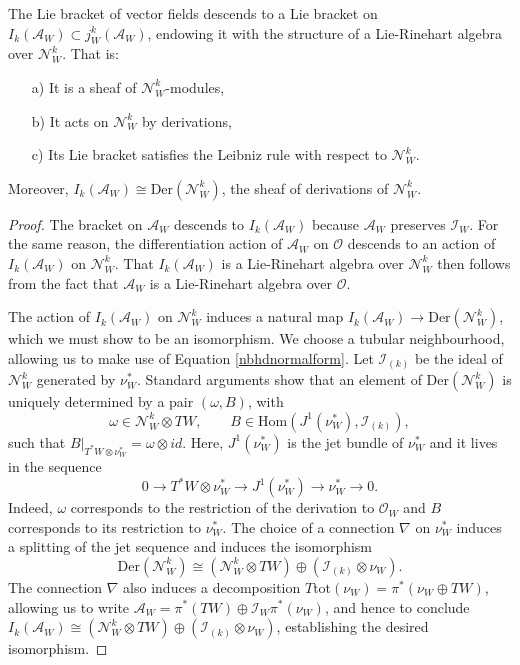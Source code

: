 \documentclass[10pt]{amsart}
\numberwithin{theoremalpha}{section}
\numberwithin{equation}{section}
\numberwithin{definition}{section}
\numberwithin{theorem}{section}
\numberwithin{proposition}{section}
\numberwithin{lemma}{section}
\numberwithin{example}{section}
\numberwithin{remark}{section}
\numberwithin{corollary}{section}
\numberwithin{question}{section}
\numberwithin{problem}{section}
\numberwithin{assumption}{section}
\theoremstyle{named}
\numberwithin{equation}{section}
\begin{document}
\begin{proposition} \label{derivationtheorem}
The Lie bracket of vector fields descends to a Lie bracket on $I_{k}(\mathcal{A}_{W}) \subset j^k_W(\mathcal{A}_W)$, endowing it with the structure of a Lie-Rinehart algebra over $\mathcal{N}_{W}^{k}$. That is: 
\begin{itemize}
\item[a)] It is a sheaf of $\mathcal{N}_{W}^{k}$-modules, 
\item[b)] It acts on $\mathcal{N}_{W}^{k}$ by derivations, 
\item[c)] Its Lie bracket satisfies the Leibniz rule with respect to $\mathcal{N}_{W}^{k}$. 
\end{itemize} 
Moreover, $I_{k}(\mathcal{A}_{W}) \cong \mathrm{Der}(\mathcal{N}_{W}^{k})$, the sheaf of derivations of $\mathcal{N}_{W}^{k}$. 
\end{proposition}
\begin{proof}
The bracket on $\mathcal{A}_{W}$ descends to $I_{k}(\mathcal{A}_{W})$ because $\mathcal{A}_{W}$ preserves $\mathcal{I}_W$. For the same reason, the differentiation action of $\mathcal{A}_{W}$ on $\mathcal{O}$ descends to an action of $I_{k}(\mathcal{A}_{W})$ on $\mathcal{N}_{W}^{k}$. That $I_{k}(\mathcal{A}_{W})$ is a Lie-Rinehart algebra over $\mathcal{N}_{W}^{k}$ then follows from the fact that $\mathcal{A}_{W}$ is a Lie-Rinehart algebra over $\mathcal{O}$. 

The action of $I_{k}(\mathcal{A}_{W})$ on $\mathcal{N}_{W}^{k}$ induces a natural map $I_{k}(\mathcal{A}_{W}) \to \mathrm{Der}(\mathcal{N}_{W}^{k})$, which we must show to be an isomorphism. We choose a tubular neighbourhood, allowing us to make use of Equation \ref{nbhdnormalform}. Let $\mathcal{I}_{(k)}$ be the ideal of $\mathcal{N}_{W}^{k}$ generated by $\nu_{W}^{*}$. Standard arguments show that an element of $\mathrm{Der}(\mathcal{N}_{W}^{k})$ is uniquely determined by a pair $(\omega, B)$, with 
\[
\omega \in \mathcal{N}_{W}^{k} \otimes TW, \qquad B \in \mathrm{Hom}(J^1(\nu_{W}^{*}), \mathcal{I}_{(k)}), 
\]
such that $B|_{T^*W \otimes \nu_{W}^{*}} = \omega \otimes id$. Here, $J^1(\nu_{W}^{*})$ is the jet bundle of $\nu_{W}^*$ and it lives in the sequence 
\[
0 \to T^*W \otimes \nu_{W}^* \to J^1(\nu_{W}^{*}) \to \nu_{W}^* \to 0. 
\]
Indeed, $\omega$ corresponds to the restriction of the derivation to $\mathcal{O}_{W}$ and $B$ corresponds to its restriction to $\nu_{W}^*$. The choice of a connection $\nabla$ on $\nu_{W}^*$ induces a splitting of the jet sequence and induces the isomorphism 
\[
\mathrm{Der}(\mathcal{N}_{W}^{k}) \cong  (\mathcal{N}_W^k \otimes TW) \oplus (\mathcal{I}_{(k)} \otimes \nu_{W}).
\]
The connection $\nabla$ also induces a decomposition $T\mathrm{tot}(\nu_{W}) = \pi^*(\nu_{W} \oplus TW)$, allowing us to write $\mathcal{A}_{W} = \pi^*(TW) \oplus \mathcal{I}_W  \pi^*(\nu_{W})$, and hence to conclude $I_{k}(\mathcal{A}_{W}) \cong  (\mathcal{N}_W^k \otimes TW) \oplus (\mathcal{I}_{(k)} \otimes \nu_{W})$, establishing the desired isomorphism. 
\end{proof}
\end{document}
